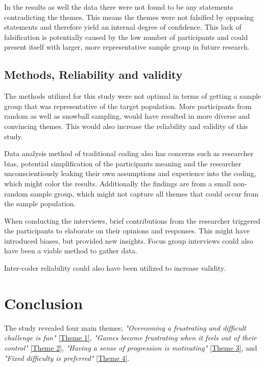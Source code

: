 In the results as well the data there were not found to be any statements contradicting the themes. This means the themes were not falsified by opposing statements and therefore yield an internal degree of confidence. This lack of falsification is potentially caused by the low number of participants and could present itself with larger, more representative sample group in future research.


\subsection{Methods, Reliability and validity}

The methods utilized for this study were not optimal in terms of getting a sample group that was representative of the target population. More participants from random as well as snowball sampling, would have resulted in more diverse and convincing themes. This would also increase the reliability and validity of this study.

Data analysis method of traditional coding also has concerns such as researcher bias, potential simplification of the participants meaning and the researcher unconscientiously leaking their own assumptions and experience into the coding, which might color the results. Additionally the findings are from a small non-random sample group, which might not capture all themes that could occur from the sample population.

When conducting the interviews, brief contributions from the researcher triggered the participants to elaborate on their opinions and responses. This might have introduced biases, but provided new insights. Focus group interviews could also have been a viable method to gather data. 


Inter-coder reliability could also have been utilized to increase validity.

\clearpage

\section{Conclusion}
The study revealed four main themes; \textit{"Overcoming a frustrating and difficult challenge is fun"} \ref{Theme 1}, \textit{"Games become frustrating when it feels out of their control"} \ref{Theme 2}, \textit{"Having a sense of progression is motivating"} \ref{Theme 3}, and \textit{"Fixed difficulty is preferred"} \ref{Theme 4}.

